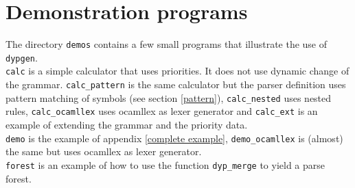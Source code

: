 \documentclass[12pt]{article}
\begin{document}
{%



\section{Demonstration programs}

The directory \verb|demos| contains a few small programs that illustrate the use of \verb|dypgen|.\\

\verb|calc| is a simple calculator that uses priorities. It does not use dynamic change of the grammar. \verb|calc_pattern| is the same calculator but the parser definition uses pattern matching of symbols (see section \ref{pattern}), \verb|calc_nested| uses nested rules, \verb|calc_ocamllex| uses ocamllex as lexer generator and \verb|calc_ext| is an example of extending the grammar and the priority data.\\

\verb|demo| is the example of appendix \ref{complete example}, \verb|demo_ocamllex| is (almost) the same but uses ocamllex as lexer generator.\\

\verb|forest| is an example of how to use the function \verb|dyp_merge| to yield a parse forest.\\

}
\end{document}
